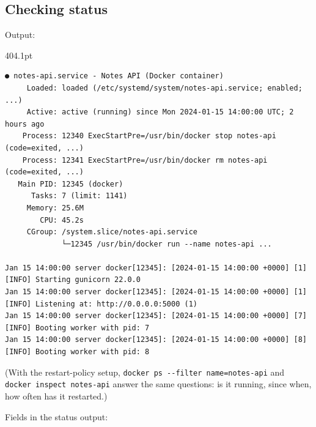\subsection*{Checking status}\label{25-process-management:checking-status}

\begin{codebox}[short]

\begin{Shaded}
\begin{Highlighting}[]
\end{Highlighting}
\end{Shaded}

\end{codebox}

\noindent{}Output:

\begin{diagrambox}[short]{404.1pt}
\begin{Verbatim}[fontsize=\fontsize{6.7}{6.37}\selectfont]
● notes-api.service - Notes API (Docker container)
     Loaded: loaded (/etc/systemd/system/notes-api.service; enabled; ...)
     Active: active (running) since Mon 2024-01-15 14:00:00 UTC; 2 hours ago
    Process: 12340 ExecStartPre=/usr/bin/docker stop notes-api (code=exited, ...)
    Process: 12341 ExecStartPre=/usr/bin/docker rm notes-api (code=exited, ...)
   Main PID: 12345 (docker)
      Tasks: 7 (limit: 1141)
     Memory: 25.6M
        CPU: 45.2s
     CGroup: /system.slice/notes-api.service
             └─12345 /usr/bin/docker run --name notes-api ...

Jan 15 14:00:00 server docker[12345]: [2024-01-15 14:00:00 +0000] [1] [INFO] Starting gunicorn 22.0.0
Jan 15 14:00:00 server docker[12345]: [2024-01-15 14:00:00 +0000] [1] [INFO] Listening at: http://0.0.0.0:5000 (1)
Jan 15 14:00:00 server docker[12345]: [2024-01-15 14:00:00 +0000] [7] [INFO] Booting worker with pid: 7
Jan 15 14:00:00 server docker[12345]: [2024-01-15 14:00:00 +0000] [8] [INFO] Booting worker with pid: 8
\end{Verbatim}
\end{diagrambox}

\noindent{}(With the restart-policy setup, \texttt{docker\ ps\ -}\allowbreak{}\texttt{-}\allowbreak{}\texttt{filter\ name=}\allowbreak{}\texttt{notes-}\allowbreak{}\texttt{api} and \texttt{docker\ inspect\ notes-}\allowbreak{}\texttt{api} answer the same questions: is it running, since when, how often has it restarted.)

Fields in the status output:

